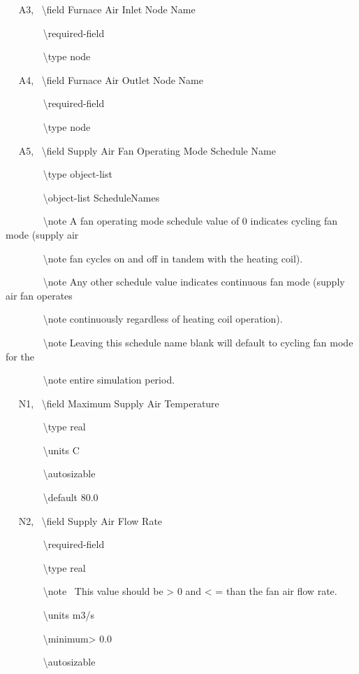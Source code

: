 ~~ A3,~ \textbackslash{}field Furnace Air Inlet Node Name

~~~~~~~ \textbackslash{}required-field

~~~~~~~ \textbackslash{}type node

~~ A4,~ \textbackslash{}field Furnace Air Outlet Node Name

~~~~~~~ \textbackslash{}required-field

~~~~~~~ \textbackslash{}type node

~~ A5,~ \textbackslash{}field Supply Air Fan Operating Mode Schedule Name

~~~~~~~ \textbackslash{}type object-list

~~~~~~~ \textbackslash{}object-list ScheduleNames

~~~~~~~ \textbackslash{}note A fan operating mode schedule value of 0 indicates cycling fan mode (supply air

~~~~~~~ \textbackslash{}note fan cycles on and off in tandem with the heating coil).

~~~~~~~ \textbackslash{}note Any other schedule value indicates continuous fan mode (supply air fan operates

~~~~~~~ \textbackslash{}note continuously regardless of heating coil operation).

~~~~~~~ \textbackslash{}note Leaving this schedule name blank will default to cycling fan mode for the

~~~~~~~ \textbackslash{}note entire simulation period.

~~ N1,~ \textbackslash{}field Maximum Supply Air Temperature

~~~~~~~ \textbackslash{}type real

~~~~~~~ \textbackslash{}units C

~~~~~~~ \textbackslash{}autosizable

~~~~~~~ \textbackslash{}default 80.0

~~ N2,~ \textbackslash{}field Supply Air Flow Rate

~~~~~~~ \textbackslash{}required-field

~~~~~~~ \textbackslash{}type real

~~~~~~~ \textbackslash{}note~ This value should be \textgreater{} 0 and \textless{} = than the fan air flow rate.

~~~~~~~ \textbackslash{}units m3/s

~~~~~~~ \textbackslash{}minimum\textgreater{} 0.0

~~~~~~~ \textbackslash{}autosizable

